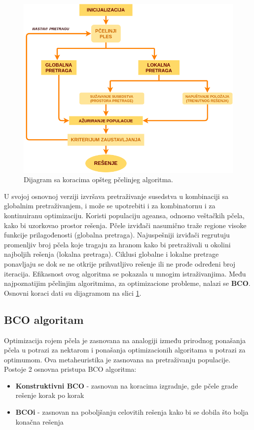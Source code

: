 \documentclass[a4paper]{article}
\begin{document}
{\begin{figure}[h!]
\begin{center}
\includegraphics[scale=0.29]{dijagram.png}
\end{center}
\caption{Dijagram sa koracima opšteg pčelinjeg algoritma.}
\label{fig:dij}
\end{figure}
U svojoj osnovnoj verziji izvršava pretraživanje susedstva u kombinaciji sa globalnim pretraživanjem, i može se upotrebiti i za kombinatornu i za kontinuiranu optimizaciju. Koristi populaciju ageansa, odnosno veštačkih pčela, kako bi uzorkovao prostor rešenja\cite{bcoalg}. Pčele izviđači nasumično traže regione visoke funkcije prilagođenosti (globalna pretraga). Najuspešniji izviđači regrutuju promenljiv broj pčela koje tragaju za hranom kako bi pretraživali u okolini najboljih rešenja (lokalna pretraga).
Ciklusi globalne i lokalne pretrage ponavljaju se dok se ne otkrije prihvatljivo rešenje ili ne prođe određeni broj iteracija. Efikasnost ovog algoritma se pokazala u mnogim istraživanjima. 
Među najpoznatijim pčelinjim algoritmima, za optimizacione probleme, nalazi se \textbf{BCO}.
Osnovni koraci dati su dijagramom na slici \ref{fig:dij}.

\subsection{BCO algoritam}
\label{subsec:bco}
Optimizacija rojem pčela je zasnovana na analogiji između prirodnog ponašanja pčela u potrazi za nektarom i ponašanja optimizacionih algoritama u potrazi za optimumom\cite{bcoalg}. Ova metaheuristika je zasnovana na pretraživanju populacije. 
Postoje 2 osnovna pristupa BCO algoritma:
\begin{itemize}%
\setlength{\labelsep}{10pt}
	\item \textbf{Konstruktivni BCO} - zasnovan na koracima izgradnje, gde pčele grade rešenje korak po korak
	\item \textbf{BCOi} - zasnovan na poboljšanju celovitih rešenja kako bi se dobila što bolja konačna rešenja \cite{bcoalg}
\end{itemize}

}
\end{document}
